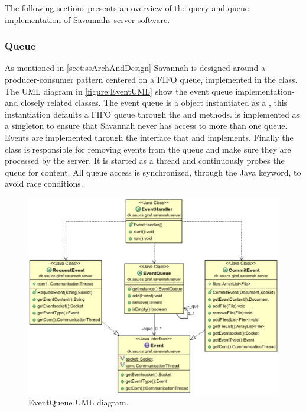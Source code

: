The following sections presents an overview of the query and queue implementation of Savannahs server software.
\subsubsection{Queue}

As mentioned in \autoref{sect:ssArchAndDesign} Savannah is designed around a producer-consumer pattern centered on a FIFO queue, implemented in the  class.
The UML diagram in \autoref{figure:EventUML} show the event queue implementation- and closely related classes.
The event queue is a  object instantiated as a , this instantiation defaults a FIFO queue through
the  and  methods.  is implemented as a singleton to ensure that Savannah never has access to more than one queue.
Events are implemented through the  interface that  and  implements.
Finally the  class is responsible for removing events from the queue and make sure they are processed by the server. It is started as a thread and
continuously probes the queue for content. All queue access is synchronized, through the Java  keyword, to avoid race conditions.

\begin{figure}[H]
 \centering
  \includegraphics[scale=0.65]{images/EventQueue}
  \caption{EventQueue UML diagram.}
  \label{figure:EventUML}
\end{figure}

